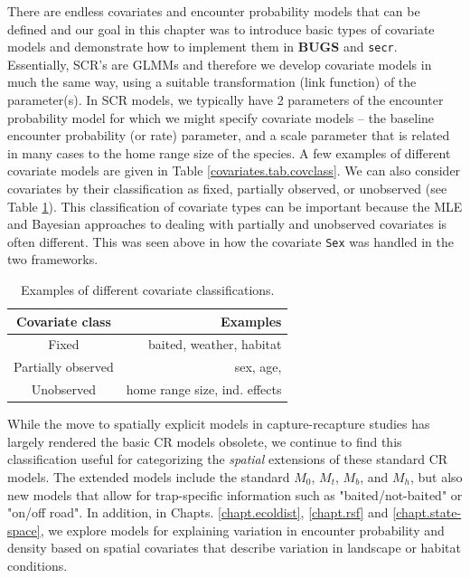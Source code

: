 There are endless covariates and encounter probability models that can
be defined and our goal in this chapter was to introduce basic types
of covariate models and demonstrate how to implement them in {\bf
  BUGS} and \mbox{\tt secr}.  Essentially, SCR's are GLMMs and
therefore we develop covariate models in much the same way, using a
suitable transformation (link function) of the parameter(s). In SCR
models, we typically have 2 parameters of the encounter probability
model for which we might specify covariate models -- the baseline
encounter probability (or rate) parameter, and a scale parameter that
is related in many cases to the home range size of the species.  A few
examples of different covariate models are given in Table
\ref{covariates.tab.covclass}.  We can also consider covariates by
their classification as fixed, partially observed, or unobserved (see
Table \ref{covariates.tab.covobs}). This classification of covariate
types can be important because the MLE and Bayesian approaches to
dealing with partially and unobserved covariates is often different.
This was seen above in how the covariate \mbox{\tt Sex} was handled in
the two frameworks.

\begin{table}[ht]
\centering
\caption{Examples of different covariate classifications.}
\begin{tabular}{cr}
\hline \hline
Covariate class & Examples \\
\hline 
Fixed & baited, weather, habitat\\
Partially observed & sex, age, \\
Unobserved &  home range size, ind. effects  \\ \hline
\end{tabular}
\label{covariates.tab.covobs}
\end{table}

While the move to spatially explicit models in capture-recapture
studies has largely rendered the basic CR models
\citep{otis_etal:1978} obsolete, we continue to find this
classification useful for categorizing the {\it spatial} extensions of
these standard CR models.  The extended models include the standard
$M_0$, $M_t$, $M_b$, and $M_h$, but also new models that allow for
trap-specific information such as "baited/not-baited" or "on/off
road".  In addition, in Chapts. \ref{chapt.ecoldist}, \ref{chapt.rsf}
and \ref{chapt.state-space}, we explore models for
explaining variation in encounter probability and density based on
spatial covariates that describe variation in landscape or habitat
conditions.

